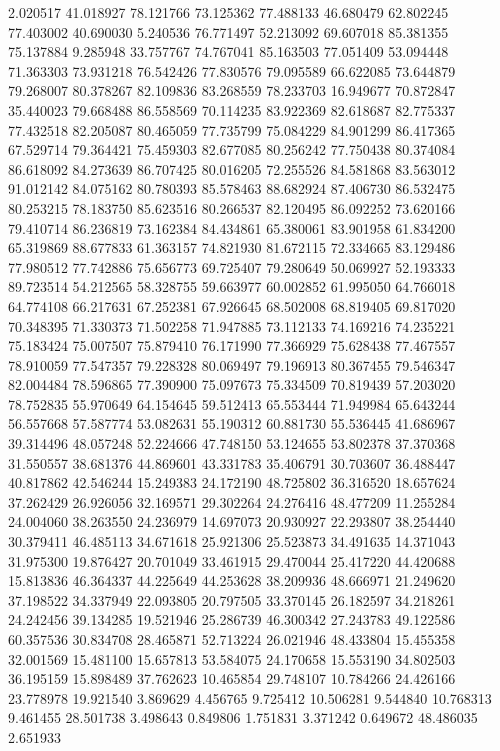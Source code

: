 2.020517
41.018927
78.121766
73.125362
77.488133
46.680479
62.802245
77.403002
40.690030
5.240536
76.771497
52.213092
69.607018
85.381355
75.137884
9.285948
33.757767
74.767041
85.163503
77.051409
53.094448
71.363303
73.931218
76.542426
77.830576
79.095589
66.622085
73.644879
79.268007
80.378267
82.109836
83.268559
78.233703
16.949677
70.872847
35.440023
79.668488
86.558569
70.114235
83.922369
82.618687
82.775337
77.432518
82.205087
80.465059
77.735799
75.084229
84.901299
86.417365
67.529714
79.364421
75.459303
82.677085
80.256242
77.750438
80.374084
86.618092
84.273639
86.707425
80.016205
72.255526
84.581868
83.563012
91.012142
84.075162
80.780393
85.578463
88.682924
87.406730
86.532475
80.253215
78.183750
85.623516
80.266537
82.120495
86.092252
73.620166
79.410714
86.236819
73.162384
84.434861
65.380061
83.901958
61.834200
65.319869
88.677833
61.363157
74.821930
81.672115
72.334665
83.129486
77.980512
77.742886
75.656773
69.725407
79.280649
50.069927
52.193333
89.723514
54.212565
58.328755
59.663977
60.002852
61.995050
64.766018
64.774108
66.217631
67.252381
67.926645
68.502008
68.819405
69.817020
70.348395
71.330373
71.502258
71.947885
73.112133
74.169216
74.235221
75.183424
75.007507
75.879410
76.171990
77.366929
75.628438
77.467557
78.910059
77.547357
79.228328
80.069497
79.196913
80.367455
79.546347
82.004484
78.596865
77.390900
75.097673
75.334509
70.819439
57.203020
78.752835
55.970649
64.154645
59.512413
65.553444
71.949984
65.643244
56.557668
57.587774
53.082631
55.190312
60.881730
55.536445
41.686967
39.314496
48.057248
52.224666
47.748150
53.124655
53.802378
37.370368
31.550557
38.681376
44.869601
43.331783
35.406791
30.703607
36.488447
40.817862
42.546244
15.249383
24.172190
48.725802
36.316520
18.657624
37.262429
26.926056
32.169571
29.302264
24.276416
48.477209
11.255284
24.004060
38.263550
24.236979
14.697073
20.930927
22.293807
38.254440
30.379411
46.485113
34.671618
25.921306
25.523873
34.491635
14.371043
31.975300
19.876427
20.701049
33.461915
29.470044
25.417220
44.420688
15.813836
46.364337
44.225649
44.253628
38.209936
48.666971
21.249620
37.198522
34.337949
22.093805
20.797505
33.370145
26.182597
34.218261
24.242456
39.134285
19.521946
25.286739
46.300342
27.243783
49.122586
60.357536
30.834708
28.465871
52.713224
26.021946
48.433804
15.455358
32.001569
15.481100
15.657813
53.584075
24.170658
15.553190
34.802503
36.195159
15.898489
37.762623
10.465854
29.748107
10.784266
24.426166
23.778978
19.921540
3.869629
4.456765
9.725412
10.506281
9.544840
10.768313
9.461455
28.501738
3.498643
0.849806
1.751831
3.371242
0.649672
48.486035
2.651933
